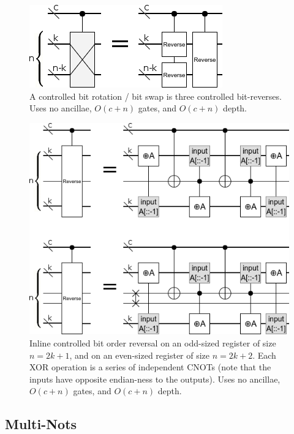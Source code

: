 \documentclass[twocolumn,longbibliography]{quantumarticle-customized}
\begin{document}
\begin{figure}
  \centering
  \includegraphics[width=\linewidth]{assets/controlled-bit-rotate.png}
  \caption{
    A controlled bit rotation / bit swap is three controlled bit-reverses.
    Uses no ancillae, $O(c + n)$ gates, and $O(c + n)$ depth.
  }
  \label{fig:bit-rotate}
\end{figure}

\begin{figure}
  \centering
  \includegraphics[width=\linewidth]{assets/controlled-reverse.png}
  \caption{
    Inline controlled bit order reversal on an odd-sized register of size $n=2k+1$, and on an even-sized register of size $n=2k+2$.
    Each XOR operation is a series of independent CNOTs (note that the inputs have opposite endian-ness to the outputs).
    Uses no ancillae, $O(c + n)$ gates, and $O(c + n)$ depth.
  }
  \label{fig:bit-reverse}
\end{figure}


\subsection{Multi-Nots}
\end{document}
